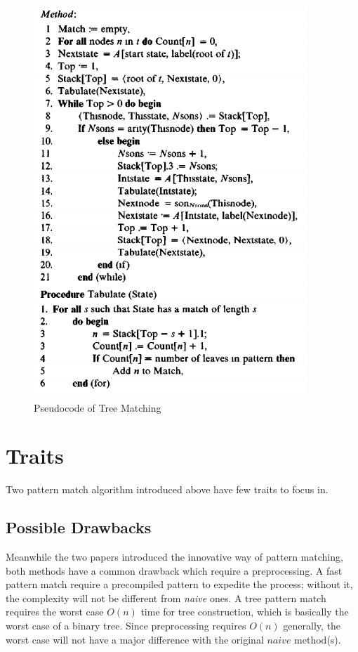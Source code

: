 \documentclass{acm_proc_article-sp}
\begin{document}
\begin{figure}
  \caption{Pseudocode of Tree Matching~\cite{Tree}}
  \includegraphics[scale=.7]{treematch02}
\end{figure}

\section{Traits}
\begin{flushleft}
Two pattern match algorithm introduced above have few traits to focus in.
\end{flushleft}

\subsection{Possible Drawbacks}
\begin{flushleft}
Meanwhile the two papers introduced the innovative way of pattern matching, both methods have a common drawback which require a preprocessing. A fast pattern match require a precompiled pattern to expedite the process; without it, the complexity will not be different from \textit{naive} ones. A tree pattern match requires the worst case $O(n)$ time for tree construction, which is basically the worst case of a binary tree. Since preprocessing requires $O(n)$ generally, the worst case will not have a major difference with the original $naive$ method(s).
\end{flushleft}
\end{document}
